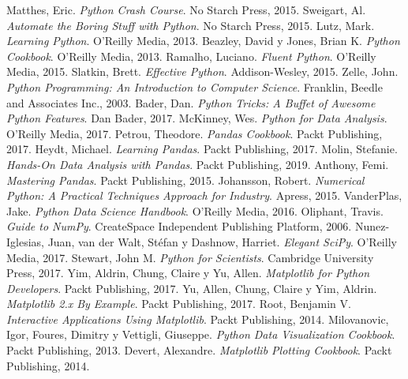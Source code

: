 \documentclass[conference]{IEEEtran}
\begin{document}
\begin{thebibliography}{00}
     Matthes, Eric. \textit{Python Crash Course}. No Starch Press, 2015.
     Sweigart, Al. \textit{Automate the Boring Stuff with Python}. No Starch Press, 2015.
     Lutz, Mark. \textit{Learning Python}. O'Reilly Media, 2013.
     Beazley, David y Jones, Brian K. \textit{Python Cookbook}. O'Reilly Media, 2013.
     Ramalho, Luciano. \textit{Fluent Python}. O'Reilly Media, 2015.
     Slatkin, Brett. \textit{Effective Python}. Addison-Wesley, 2015.
     Zelle, John. \textit{Python Programming: An Introduction to Computer Science}. Franklin, Beedle and Associates Inc., 2003.
     Bader, Dan. \textit{Python Tricks: A Buffet of Awesome Python Features}. Dan Bader, 2017.
     McKinney, Wes. \textit{Python for Data Analysis}. O'Reilly Media, 2017.
     Petrou, Theodore. \textit{Pandas Cookbook}. Packt Publishing, 2017.
     Heydt, Michael. \textit{Learning Pandas}. Packt Publishing, 2017.
     Molin, Stefanie. \textit{Hands-On Data Analysis with Pandas}. Packt Publishing, 2019.
     Anthony, Femi. \textit{Mastering Pandas}. Packt Publishing, 2015.
     Johansson, Robert. \textit{Numerical Python: A Practical Techniques Approach for Industry}. Apress, 2015.
     VanderPlas, Jake. \textit{Python Data Science Handbook}. O'Reilly Media, 2016.
     Oliphant, Travis. \textit{Guide to NumPy}. CreateSpace Independent Publishing Platform, 2006.
     Nunez-Iglesias, Juan, van der Walt, Stéfan y Dashnow, Harriet. \textit{Elegant SciPy}. O'Reilly Media, 2017.
     Stewart, John M. \textit{Python for Scientists}. Cambridge University Press, 2017.
     Yim, Aldrin, Chung, Claire y Yu, Allen. \textit{Matplotlib for Python Developers}. Packt Publishing, 2017.
     Yu, Allen, Chung, Claire y Yim, Aldrin. \textit{Matplotlib 2.x By Example}. Packt Publishing, 2017.
     Root, Benjamin V. \textit{Interactive Applications Using Matplotlib}. Packt Publishing, 2014.
     Milovanovic, Igor, Foures, Dimitry y Vettigli, Giuseppe. \textit{Python Data Visualization Cookbook}. Packt Publishing, 2013.
     Devert, Alexandre. \textit{Matplotlib Plotting Cookbook}. Packt Publishing, 2014.

\end{thebibliography}
\end{document}

